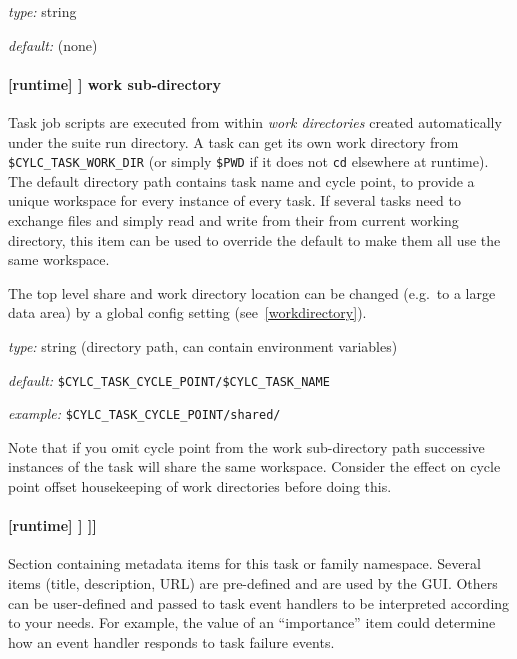 \begin{myitemize}
\item {\em type:} string
\item {\em default:} (none)
\end{myitemize}

\paragraph[work sub-directory]{[runtime] \textrightarrow [[\_\_NAME\_\_]] \textrightarrow work sub-directory}
\label{worksubdirectory}

Task job scripts are executed from within {\em work directories} created
automatically under the suite run directory. A task can get its own work
directory from \lstinline=$CYLC_TASK_WORK_DIR= (or simply \lstinline=$PWD= if
it does not \lstinline=cd= elsewhere at runtime). The default directory
path contains task name and cycle point, to provide a unique workspace for
every instance of every task. If several tasks need to exchange files and
simply read and write from their from current working directory, this item
can be used to override the default to make them all use the same workspace.

The top level share and work directory location can be changed (e.g.\ to a
large data area) by a global config setting (see~\ref{workdirectory}).

\begin{myitemize}
\item {\em type:} string (directory path, can contain environment variables)
\item {\em default:} \lstinline=$CYLC_TASK_CYCLE_POINT/$CYLC_TASK_NAME=
\item {\em example:} \lstinline=$CYLC_TASK_CYCLE_POINT/shared/=
\end{myitemize}

Note that if you omit cycle point from the work sub-directory path successive
instances of the task will share the same workspace.  Consider the effect on
cycle point offset housekeeping of work directories before doing this.

\paragraph[{[[[}meta{]]]}]{[runtime] \textrightarrow [[\_\_NAME\_\_]] \textrightarrow [[[meta]]]}

Section containing metadata items for this task or family namespace. Several items
(title, description, URL) are pre-defined and are used by the GUI. Others can be 
user-defined and passed to task event handlers to be interpreted according to your 
needs. For example, the value of an ``importance'' item could determine how an event 
handler responds to task failure events.

